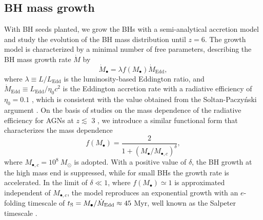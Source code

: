 \documentclass[twocolumn, twocolappendix]{aastex63}
\newcommand{\Msun}{M_\odot}
\newcommand{\Mbh}{M_\bullet}
\newcommand{\Mdot}{\dot{M}}
\newcommand{\blue}[1]{\textcolor{blue}{ #1}}
\begin{document}
\begin{CJK*}{UTF8}{gbsn}
\subsection{BH mass growth}
\label{sec:model}
With BH seeds planted, we grow the BHs with a semi-analytical accretion model and study the evolution of the BH mass distribution until $z=6$. 
The growth model is characterized by a minimal number of free parameters, 
describing the BH mass growth rate $\Mdot$ by
\begin{equation}
  \label{eq:mdot}
  \Mdot_\bullet = \lambda f(\Mbh) \Mdot_\mathrm{Edd} ,
\end{equation}
where $\lambda \equiv L/L_\mathrm{Edd}$ is the luminosity-based Eddington ratio,
and $\Mdot_\mathrm{Edd} \equiv L_{\mathrm{Edd}}/\eta_0 c^2$ is the Eddington accretion rate with a radiative efficiency of $\eta_0=0.1$ \citep{1973A&A....24..337S},
which is consistent with the value obtained from the Soltan-Paczy{\'n}ski argument \citep[e.g.,][]{2002MNRAS.335..965Y,2010ApJ...725..388C}.
On the basis of studies on the mass dependence of the radiative efficiency for AGNs at $z\lesssim$ 3 
\citep{2008MNRAS.390..561C,2012ApJ...749..187L,2014ApJ...786..104U}, 
we introduce a similar functional form that characterizes the mass dependence 
%
\begin{equation}
\label{eq:f_M}
f(\Mbh) = \frac{2}{1+\left(\Mbh /M_{\bullet,c} \right)^\delta}, 
\end{equation}
%
where $M_{\bullet,c}=10^8~\Msun$ is adopted.
With a positive value of $\delta$, the BH growth at the high mass end is suppressed, 
while for small BHs the growth rate is accelerated.
In the limit of $\delta \ll 1$, where $f(\Mbh) \simeq 1$ is approximated independent of $M_{\bullet,c}$, the model reproduces an exponential growth with an $e$-folding timescale of
$t_{\rm S} =  \Mbh/\Mdot_{\mathrm{Edd}} \approx 45$ Myr, well known as the Salpeter timescale \citep{1964ApJ...140..796S}.




\end{CJK*}
\end{document}
